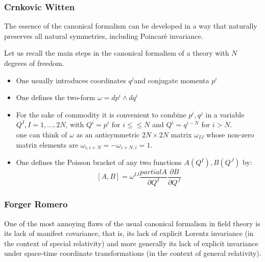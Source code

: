 \documentclass[Cascione]{subfiles}
\begin{document}
	
	
	
	
	
	
	
	
	
	
	
	
	
	
	
	
	
	
	
	
	
	
	
	
	
			\subsubsection{Crnkovic Witten}
			The essence of the canonical formalism can be developed in a way that naturally preserves all natural symmetries, including Poincarè invariance.
			
			Let us recall the main steps in the canonical formalism of a theory with $N$ degrees of freedom.
			\begin{itemize}
				\item  One usually introduces coordinates $q^j$and conjugate momenta $p^i$
				\item One defines the two-form $\omega = dp^i \wedge dq^i$
				\item For the sake of commodity it is convenient to combine $p^i, q^j$ in a variable $Q^I , I = 1,\ldots,2N$, with $Q^i=p^i$ for $i\leq\leq N$ and $Q^i= q^{i-N}$ for $i>N$.\\
					one can think of $\omega$ as an antisymmetric $2N \times 2N$ matrix $\omega_{I J}$ whose non-zero matrix elements are $\omega_{i, i+N} = - \omega_{i+N,i}= 1$.
				\item One defines the Poisson bracket of any two functions $A(Q^I) , B(Q^J)$ by:
					\begin{displaymath}
						\left[ A , B \right] = \omega^{I J} \frac{partial A}{\partial Q^I} \frac{\partial B}{\partial Q^J}
					\end{displaymath}
			\end{itemize}
	
		\subsubsection{Forger Romero}
			One of the most annoying flaws of the usual canonical formalism in field theory is its lack of manifest covariance, that is, its lack of explicit Lorentz invariance (in the context of special relativity) and more generally its lack of explicit invariance under space-time coordinate transformations (in the context of general relativity). 
			
\end{document}
